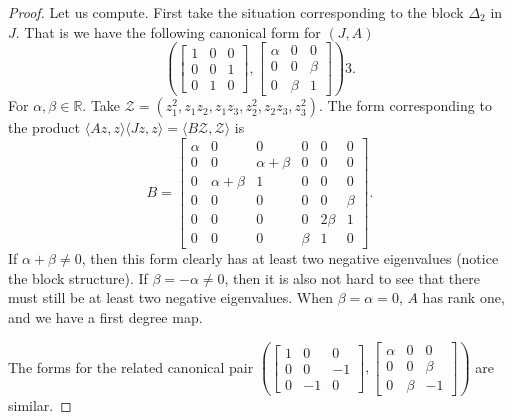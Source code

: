 \documentclass[12pt,openany]{book}
\newcommand{\R}{{\mathbb{R}}}
\newcommand{\sZ}{{\mathcal{Z}}}
\theoremstyle{plain}
\theoremstyle{remark}
\theoremstyle{definition}
\theoremstyle{exercise}
\theoremstyle{example}
\begin{document}
\begin{proof}
Let us compute.  First take the situation corresponding to
the block $\Delta_2$ in $J$.  That is we have the following canonical form 
for $(J,A)$
\begin{equation}
\left(
\begin{bmatrix}
       1 &        0 &        0\\
       0 &        0 &        1\\
       0 &        1 &        0
\end{bmatrix}
,
\begin{bmatrix}
  \alpha &        0 &        0\\
       0 &        0 &    \beta\\
       0 &    \beta &        1
\end{bmatrix}
\right)3.
\end{equation}
For $\alpha, \beta \in \R$.
Take
$\sZ = (z_1^2,z_1z_2,z_1z_3,z_2^2,z_2z_3,z_3^2)$.
The form corresponding to the product
$\langle A z, z \rangle \langle J z, z \rangle  = \langle B \sZ , \sZ
\rangle$ is
\begin{equation} \label{form1B}
B=
\begin{bmatrix}
  \alpha &        0 &        0 &        0 &        0 &        0\\
       0 &        0 & \alpha+\beta &        0 &        0 &        0\\
       0 & \alpha+\beta &        1 &        0 &        0 &        0\\
       0 &        0 &        0 &        0 &        0 &    \beta\\
       0 &        0 &        0 &        0 &   2\beta &        1\\
       0 &        0 &        0 &    \beta &        1 &        0
\end{bmatrix} .
\end{equation}
If $\alpha+\beta \not= 0$, then
this form clearly has at least two negative eigenvalues (notice the block
structure). 
If $\beta = -\alpha \not= 0$, then it is also not hard to see that there must
still be at least two negative eigenvalues.  When $\beta = \alpha = 0$,
$A$ has rank one, and we have a first degree map.

The forms for the related canonical pair
$\left(
\left[
\begin{smallmatrix}
       1 &        0 &        0\\
       0 &        0 &        -1\\
       0 &        -1 &        0
\end{smallmatrix}
\right]
,
\left[
\begin{smallmatrix}
  \alpha &        0 &        0\\
       0 &        0 &    \beta\\
       0 &    \beta &        -1
\end{smallmatrix}
\right]
\right)$ are similar.



\end{proof}
\end{document}
